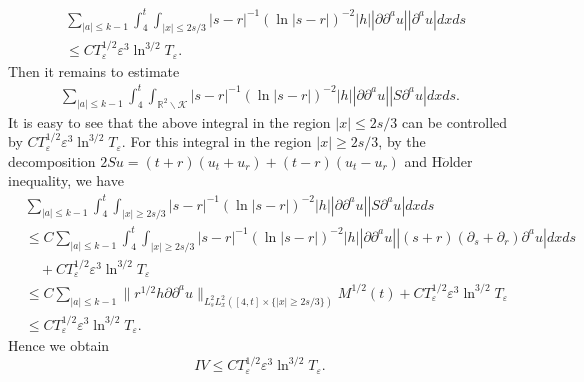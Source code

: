 \documentclass[11pt, reqno]{amsart}
\theoremstyle{definition}
\theoremstyle{remark}
\theoremstyle{definition}
\numberwithin{equation}{section}
\numberwithin{equation}{section}
\def\leq{\leqslant}
\def\geq{\geqslant}
\begin{document}
\begin{align*}
&\sum_{|a|\leq
k-1}\int_4^t\int_{|x|\leq2s/3}|s-r|^{-1}(\ln|s-r|)^{-2}|h||\partial\partial^a
u||\partial^au|dxds
\\&\leq CT_{\varepsilon}^{1/2}\varepsilon^3\ln^{3/2}T_{\varepsilon}.
\end{align*}
Then it remains to estimate
\begin{align*}
\sum_{|a|\leq k-1}\int_4^t\int_{\mathbb R^2\backslash\mathcal
{K}}|s-r|^{-1}(\ln|s-r|)^{-2}|h||\partial\partial^a
u||S\partial^au|dxds.
\end{align*}
It is easy to see that the above integral in the region $|x|\leq2s/3$ can be controlled by $CT_{\varepsilon}^{1/2}\varepsilon^3\ln^{3/2}T_{\varepsilon}$.
For this integral in the region $|x|\geq2s/3$, by the decomposition $2Su=(t+r)(u_t+u_r)+(t-r)(u_t-u_r)$ and H$\ddot{o}$lder inequality, we have
\begin{align*}
&\sum_{|a|\leq
k-1}\int_4^t\int_{|x|\geq2s/3}|s-r|^{-1}(\ln|s-r|)^{-2}|h||\partial\partial^a
u||S\partial^au|dxds
\\&\leq C\sum_{|a|\leq
k-1}\int_4^t\int_{|x|\geq2s/3}|s-r|^{-1}(\ln|s-r|)^{-2}|h||\partial\partial^a
u||(s+r)(\partial_s+\partial_r)\partial^au|dxds
\\&\quad+CT_{\varepsilon}^{1/2}\varepsilon^3\ln^{3/2}T_{\varepsilon}
\\&\leq C\sum_{|a|\leq k-1}\|r^{1/2}h\partial\partial^a
u\|_{L_s^2L_x^2([4,t]\times\{|x|\geq2s/3\})}M^{1/2}(t)+CT_{\varepsilon}^{1/2}\varepsilon^3\ln^{3/2}T_{\varepsilon}
\\&\leq CT_{\varepsilon}^{1/2}\varepsilon^3\ln^{3/2}T_{\varepsilon}.
\end{align*}
Hence we obtain 
\[IV\leq
CT_{\varepsilon}^{1/2}\varepsilon^3\ln^{3/2}T_{\varepsilon}.
\]
\end{document}
